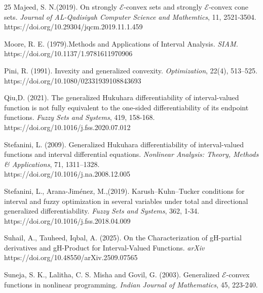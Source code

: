 \documentclass[12pt, reqno]{amsart}
\theoremstyle{definition}
\theoremstyle{remark}
\numberwithin{equation}{section}
\begin{document}
\begin{thebibliography}{25}
 Majeed, S. N.(2019). On strongly $\mathcal{E}$-convex sets and strongly $\mathcal{E}$-convex cone sets. \textit{Journal of  AL-Qadisiyah Computer Science and Mathemtics}, 11, 2521-3504.\\
https://doi.org/10.29304/jqcm.2019.11.1.459


 Moore, R. E. (1979).Methods and Applications of Interval Analysis. \textit{SIAM.}\\
https://doi.org/10.1137/1.9781611970906
       	 

  Pini, R. (1991). Invexity and generalized convexity. \textit{Optimization}, 22(4), 513–525.\\ https://doi.org/10.1080/02331939108843693

  Qiu,D. (2021). The generalized Hukuhara differentiability of interval-valued function is not fully equivalent to the one-sided differentiability of its endpoint functions. \textit{Fuzzy Sets and Systems}, 419, 158-168.\\
https://doi.org/10.1016/j.fss.2020.07.012


 Stefanini, L. (2009). Generalized Hukuhara differentiability of interval-valued functions and interval differential equations. \textit{Nonlinear Analysis: Theory, Methods \& Applications}, 71, 1311–1328.\\
https://doi.org/10.1016/j.na.2008.12.005

 Stefanini, L., Arana-Jiménez, M.,(2019).
Karush–Kuhn–Tucker conditions for interval and fuzzy optimization in several variables under total and directional generalized differentiability. \textit{Fuzzy Sets and Systems}, 362, 1-34.\\
https://doi.org/10.1016/j.fss.2018.04.009

 Suhail, A., Tauheed, Iqbal, A. (2025). On the Characterization of gH-partial derivatives and gH-Product for Interval-Valued Functions. \textit{arXiv}\\
https://doi.org/10.48550/arXiv.2509.07565
       	     	
 Suneja, S. K., Lalitha, C. S. Misha and Govil, G. (2003). Generalized $\mathcal{E}$-convex functions in nonlinear programming. \textit{Indian Journal of Mathematics}, 45, 223-240.
    

\end{thebibliography}
\end{document}
